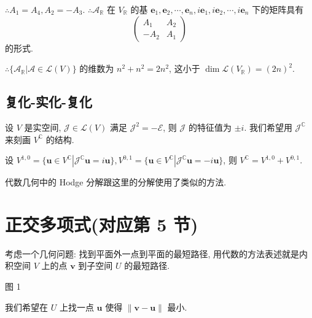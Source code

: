 \documentclass{ctexart}
\begin{document}
$\therefore A_1=A_4,A_2=-A_3$. $\therefore\mathcal{A}_\mathbb{R}$ 在 $V_\mathbb{R}$ 的基 $\boldsymbol{e}_1,\boldsymbol{e}_2,\cdots,\boldsymbol{e}_n,i\boldsymbol{e}_1,i\boldsymbol{e}_2,\cdots,i\boldsymbol{e}_n$ 下的矩阵具有
\[\begin{pmatrix}
    A_1 & A_2 \\
    -A_2 & A_1
\end{pmatrix}\]
的形式.  %

$\therefore\{\mathcal{A}_\mathbb{R}|\mathcal{A}\in\mathcal{L}(V)\}$ 的维数为 $n^2+n^2=2n^2$, 这小于 $\dim\mathcal{L}(V_\mathbb{R})=(2n)^2$.
\subsection{复化-实化-复化}
设 $V$ 是实空间, $\mathcal{J}\in\mathcal{L}(V)$ 满足 $\mathcal{J}^2=-\mathcal{E}$, 则 $\mathcal{J}$ 的特征值为 $\pm i$. 我们希望用 $\mathcal{J}^\mathbb{C}$ 来刻画 $V^\mathbb{C}$ 的结构.

设 $V^{1,0}=\{\boldsymbol{u}\in V^\mathbb{C}|\mathcal{J}^\mathbb{C}\boldsymbol{u}=i\boldsymbol{u}\},V^{0,1}=\{\boldsymbol{u}\in V^\mathbb{C}|\mathcal{J}^\mathbb{C}\boldsymbol{u}=-i\boldsymbol{u}\}$, 则 $V^\mathbb{C}=V^{1,0}+V^{0,1}$.

代数几何中的 Hodge 分解跟这里的分解使用了类似的方法.
\section{正交多项式(对应第 5 节)}
考虑一个几何问题: 找到平面外一点到平面的最短路径, 用代数的方法表述就是内积空间 $V$ 上的点 $\boldsymbol{v}$ 到子空间 $U$ 的最短路径.
\begin{center}

    图 1
\end{center}

我们希望在 $U$ 上找一点 $\boldsymbol{u}$ 使得 $\|\boldsymbol{v}-\boldsymbol{u}\|$ 最小.
\end{document}
